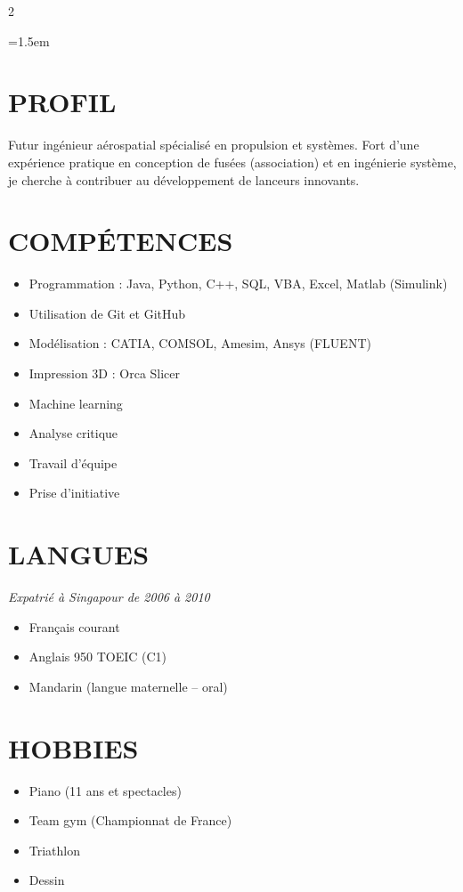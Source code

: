\documentclass[10pt,a4paper]{article}
\begin{document}
\setlength{\columnsep}{16pt}
\begin{paracol}{2}

\raggedright
\emergencystretch=1.5em
\section{PROFIL}
Futur ingénieur aérospatial spécialisé en propulsion et systèmes.
Fort d'une expérience pratique en conception de fusées (association)
et en ingénierie système, je cherche à contribuer au développement
de lanceurs innovants.

\section{COMPÉTENCES}
\begin{itemize}
    \item Programmation : Java, Python, C++, SQL, VBA, Excel, Matlab (Simulink)
    \item Utilisation de Git et GitHub
    \item Modélisation : CATIA, COMSOL, Amesim, Ansys (FLUENT)
    \item Impression 3D : Orca Slicer
    \item Machine learning
    \item Analyse critique
    \item Travail d'équipe
    \item Prise d'initiative
\end{itemize}

\section{LANGUES}
{\itshape Expatrié à Singapour de 2006 à 2010}
\begin{itemize}
    \item Français courant
    \item Anglais 950 TOEIC (C1)
    \item Mandarin (langue maternelle -- oral)
\end{itemize}

\section{HOBBIES}
\begin{itemize}
    \item Piano (11 ans et spectacles)
    \item Team gym (Championnat de France)
    \item Triathlon
    \item Dessin
\end{itemize}


\end{paracol}
\end{document}
